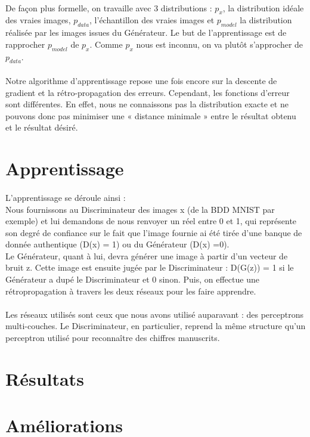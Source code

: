 \paragraph{}
De façon plus formelle, on travaille avec 3 distributions : $p_x$, la distribution idéale des vraies images, $p_{data}$, l’échantillon des vraies images et $p_{model}$ la distribution réalisée par les images issues du Générateur. Le but de l’apprentissage est de rapprocher $p_{model}$ de $p_x$. Comme $p_x$ nous est inconnu, on va plutôt s'approcher de $p_{data}$.

\paragraph{}
Notre algorithme d’apprentissage repose une fois encore sur la descente de gradient et la rétro-propagation des erreurs. Cependant, les fonctions d’erreur sont différentes. En effet, nous ne connaissons pas la distribution exacte et ne pouvons donc pas minimiser une « distance minimale » entre le résultat obtenu et le résultat désiré. 

\section{Apprentissage}
\paragraph{}
L’apprentissage se déroule ainsi :\\
Nous fournissons au Discriminateur des images x (de la BDD MNIST par exemple) et lui demandons de nous renvoyer un réel entre 0 et 1, qui représente son degré de confiance sur le fait que l’image fournie ai été tirée d’une banque de donnée authentique (D(x) = 1) ou du Générateur (D(x) =0).\\
Le Générateur, quant à lui, devra générer une image à partir d’un vecteur de bruit z. Cette image est ensuite jugée par le Discriminateur : D(G(z)) = 1 si le Générateur a dupé le Discriminateur et 0 sinon. Puis, on effectue une rétropropagation à travers les deux réseaux pour les faire apprendre.

\paragraph{}
Les réseaux utilisés sont ceux que nous avons utilisé auparavant : des perceptrons multi-couches. Le Discriminateur, en particulier, reprend la même structure qu’un perceptron utilisé pour reconnaître des chiffres manuscrits.

\section{Résultats}


\section{Améliorations}


